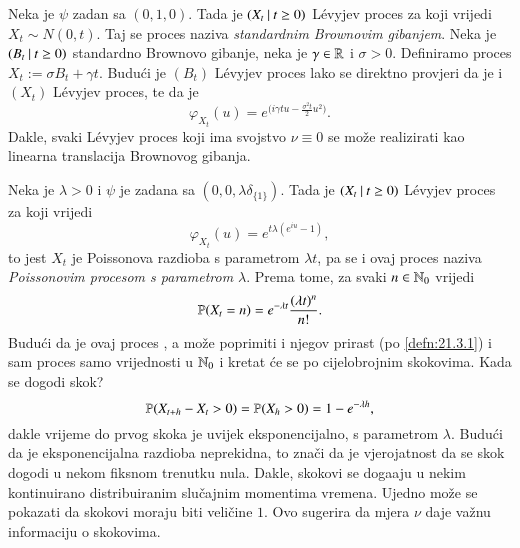 \begin{pr}  \label{pr:21.8}
    Neka je $\psi$ zadan sa $(0,1,0)$.
    Tada je $({X_t} \: | \: {t \geq 0})$ L\' evyjev proces za koji vrijedi $X_t \sim N(0, t)$.
    Taj se proces naziva \emph{standardnim Brownovim gibanjem}.
    Neka je $({B_t} \: | \: {t \geq 0})$ standardno Brownovo gibanje, neka je $\gamma \in \mathbb{R}$ i $\sigma > 0$.
    Definiramo proces $X_t := \sigma B_t + \gamma t$.
    Budu\' ci je $(B_t)$ L\' evyjev proces lako se direktno provjeri da je i $(X_t)$ L\' evyjev proces, te da je
    \begin{equation}    \label{jed:21.9}
        \varphi_{X_t} (u) = e^{\big( i \gamma t u - \frac{\sigma^2 t}{2} u^2 \big)}.
    \end{equation}
    Dakle, svaki L\' evyjev proces koji ima svojstvo $\nu \equiv 0$ se mo\v ze realizirati kao linearna translacija Brownovog gibanja.
\end{pr}

\begin{pr}  \label{pr:21.9}
    Neka je $\lambda > 0$ i $\psi$ je zadana sa $(0,0,\lambda \delta_{\{1\}})$.
    Tada je $({X_t} \: | \: {t \geq 0})$ L\' evyjev proces za koji vrijedi
    \begin{equation*}
        \varphi_{X_t} (u) = e^{t \lambda (e^{i u} - 1)},
    \end{equation*}
    to jest $X_t$ je Poissonova razdioba s parametrom $\lambda t$, pa se i ovaj proces naziva \emph{Poissonovim procesom s parametrom $\lambda$}.
    Prema tome, za svaki $n \in \mathbb{N}_0$ vrijedi
    \begin{equation}    \label{jed:21.10}
        \mathbb{P} (X_t = n) = e^{- \lambda t} \frac{(\lambda t)^n}{n !}.
    \end{equation}
    Budu\' ci da je ovaj proces \cadlag, a mo\v ze poprimiti i njegov prirast (po \ref{defn:21.3.1}) i sam proces samo vrijednosti u $\mathbb{N}_0$ i kretat \' ce se po cijelobrojnim skokovima.
    Kada se dogodi skok?
    \begin{equation*}
        \mathbb{P} (X_{t + h} - X_t > 0) = \mathbb{P} (X_h > 0) = 1 - e^{- \lambda h},
    \end{equation*}
    dakle vrijeme do prvog skoka je uvijek eksponencijalno, s parametrom $\lambda$.
    Budu\' ci da je eksponencijalna razdioba neprekidna, to zna\v ci da je vjerojatnost da se skok dogodi u nekom fiksnom trenutku nula.
    Dakle, skokovi se doga\dj aju u nekim kontinuirano distribuiranim slu\v cajnim momentima vremena.
    Ujedno mo\v ze se pokazati da skokovi moraju biti veli\v cine $1$.
    Ovo sugerira da mjera $\nu$ daje va\v znu informaciju o skokovima.
\end{pr}

